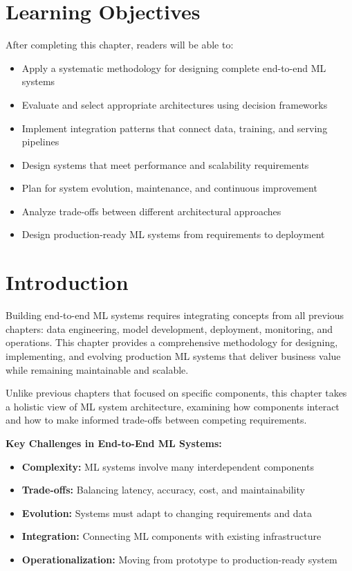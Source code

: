 \section{Learning Objectives}

After completing this chapter, readers will be able to:
\begin{itemize}
    \item Apply a systematic methodology for designing complete end-to-end ML systems
    \item Evaluate and select appropriate architectures using decision frameworks
    \item Implement integration patterns that connect data, training, and serving pipelines
    \item Design systems that meet performance and scalability requirements
    \item Plan for system evolution, maintenance, and continuous improvement
    \item Analyze trade-offs between different architectural approaches
    \item Design production-ready ML systems from requirements to deployment
\end{itemize}

\section{Introduction}

Building end-to-end ML systems requires integrating concepts from all previous chapters: data engineering, model development, deployment, monitoring, and operations. This chapter provides a comprehensive methodology for designing, implementing, and evolving production ML systems that deliver business value while remaining maintainable and scalable.

Unlike previous chapters that focused on specific components, this chapter takes a holistic view of ML system architecture, examining how components interact and how to make informed trade-offs between competing requirements.

\textbf{Key Challenges in End-to-End ML Systems:}

\begin{itemize}
    \item \textbf{Complexity:} ML systems involve many interdependent components
    \item \textbf{Trade-offs:} Balancing latency, accuracy, cost, and maintainability
    \item \textbf{Evolution:} Systems must adapt to changing requirements and data
    \item \textbf{Integration:} Connecting ML components with existing infrastructure
    \item \textbf{Operationalization:} Moving from prototype to production-ready system
\end{itemize}

